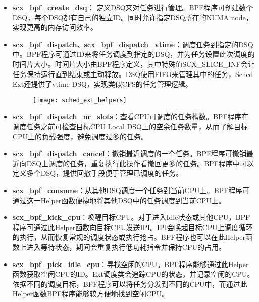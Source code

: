 \begin{itemize}

    \item \textbf{scx\_bpf\_create\_dsq}： 定义DSQ来对任务进行管理。BPF程序可创建数个DSQ，每个DSQ都有自己的独立ID。同时允许指定DSQ所在的NUMA node，实现更高的内存访问效率。

    \item \textbf{scx\_bpf\_dispatch、scx\_bpf\_dispatch\_vtime}：调度任务到指定的DSQ中。BPF程序可通过ID来将任务调度到指定的DSQ，并为任务设置此次调度的时间片大小。时间片大小由BPF程序定义，其中特殊值SCX\_SLICE\_INF会让任务保持运行直到结束或主动释放。DSQ使用FIFO来管理其中的任务，Sched Ext还提供了vtime DSQ，实现类似CFS的任务管理逻辑。

    \begin{figure}[!htbp]
        \centering
        \texttt{[image: sched\_ext\_helpers]}
        \label{fig:sched_ext_helpers}
    \end{figure}
    
    \item \textbf{scx\_bpf\_dispatch\_nr\_slots}：查看CPU可调度的任务槽数。BPF程序在调度任务之前可检查目标CPU Local DSQ上的空余任务数量，从而了解目标CPU上的负载强度，避免调度过多的任务。

    \item \textbf{scx\_bpf\_dispatch\_cancel}：撤销最近调度的一个任务。BPF程序可撤销最近向DSQ上调度的任务，重复执行此操作看撤回更多的任务。BPF程序中可以定义多个DSQ，提供回撤手段便于管理已调度的任务。
    
    \item \textbf{scx\_bpf\_consume}：从其他DSQ调度一个任务到当前CPU上。BPF程序可通过这一Helper函数便捷地将其他DSQ中的任务调度到当前CPU上。

    \item \textbf{scx\_bpf\_kick\_cpu}：唤醒目标CPU。对于进入Idle状态或其他CPU，BPF程序可通过此Helper函数向目标CPU发送IPI。IPI会唤起目标CPU上调度循环的执行，从而恢复常规的调度状态或执行抢占。BPF程序也可以在此Helper函数上进入等待状态，期间会重复执行低功耗指令并保持CPU的占用。

    \item \textbf{scx\_bpf\_pick\_idle\_cpu}：寻找空闲的CPU。BPF程序能够通过此Helper函数获取空闲CPU的ID。Ext调度类会追踪CPU的状态，并记录空闲的CPU。依据不同的调度目标，BPF程序可以将任务分发到不同的CPU中，而通过此Helper函数BPF程序能够较方便地找到空闲CPU。

\end{itemize}

